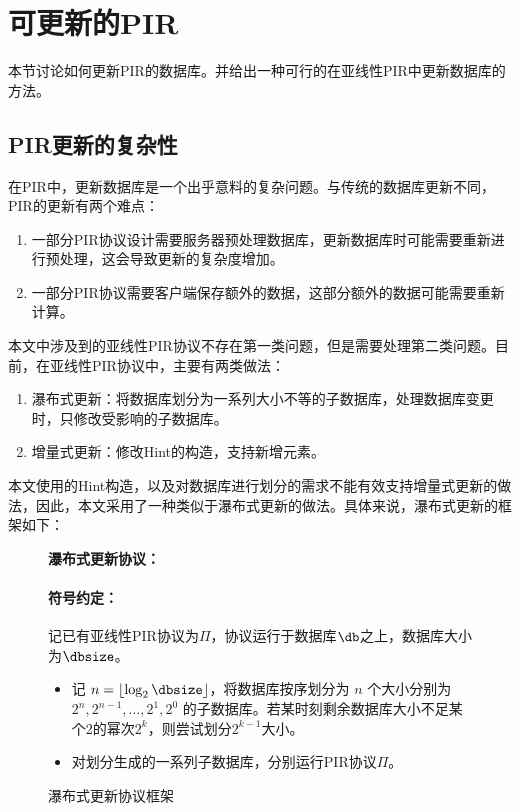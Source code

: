 \section{可更新的PIR}
\label{sec:handling-updates}
本节讨论如何更新PIR的数据库。并给出一种可行的在亚线性PIR中更新数据库的方法。

\subsection{PIR更新的复杂性}

在PIR中，更新数据库是一个出乎意料的复杂问题。与传统的数据库更新不同，PIR的更新有两个难点：
\begin{enumerate}
    \item 一部分PIR协议设计需要服务器预处理数据库，更新数据库时可能需要重新进行预处理，这会导致更新的复杂度增加。
    \item 一部分PIR协议需要客户端保存额外的数据，这部分额外的数据可能需要重新计算。
\end{enumerate}

本文中涉及到的亚线性PIR协议不存在第一类问题，但是需要处理第二类问题。目前，在亚线性PIR协议中，主要有两类做法：
\begin{enumerate}
    \item 瀑布式更新\cite{Checklist}：将数据库划分为一系列大小不等的子数据库，处理数据库变更时，只修改受影响的子数据库。
    \item 增量式更新\cite{USENIX:MZRA22}：修改Hint的构造，支持新增元素。
\end{enumerate}

本文使用的Hint构造，以及对数据库进行划分的需求不能有效支持增量式更新的做法，因此，本文采用了一种类似于瀑布式更新的做法。具体来说，瀑布式更新的框架如下：

\begin{figure*}
    \begin{mdframed}
    \centering
    \textbf{瀑布式更新协议：}
        \raggedright
        \paragraph{符号约定：} 记已有亚线性PIR协议为$\Pi$，协议运行于数据库$\db$之上，数据库大小为$\dbsize$。
        \begin{itemize}
            \item 记 $n = \lfloor\log_2{\dbsize}\rfloor$，将数据库按序划分为 $n$ 个大小分别为 $2^n, 2^{n-1}, \dots, 2^1, 2^0$ 的子数据库。若某时刻剩余数据库大小不足某个2的幂次$2^k$，则尝试划分$2^{k-1}$大小。
            \item 对划分生成的一系列子数据库，分别运行PIR协议$\Pi$。
        \end{itemize}
    \end{mdframed}
    \caption{瀑布式更新协议框架}
    \label{fig:checklist}
\end{figure*}


